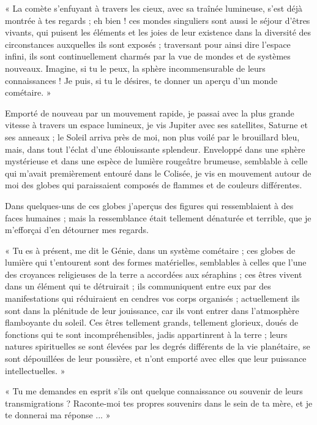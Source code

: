 \documentclass[a4paper, 11pt, oneside, landscape]{article}
\begin{document}
« La comète s'enfuyant à travers les cieux, avec sa traînée lumineuse, s'est déjà montrée à tes regards ; eh bien ! ces mondes singuliers sont aussi le séjour d'êtres vivants, qui puisent les éléments et les joies de leur existence dans la diversité des circonstances auxquelles ils sont exposés ; traversant pour ainsi dire l'espace infini, ils sont continuellement charmés par la vue de mondes et de systèmes nouveaux. Imagine, si tu le peux, la sphère incommensurable de leurs connaissances ! Je puis, si tu le désires, te donner un aperçu d'un monde cométaire. »

Emporté de nouveau par un mouvement rapide, je passai avec la plus grande vitesse à travers un espace lumineux, je vis Jupiter avec ses satellites, Saturne et ses anneaux ; le Soleil arriva près de moi, non plus voilé par le brouillard bleu, mais, dans tout l'éclat d'une éblouissante splendeur. Enveloppé dans une sphère mystérieuse et dans une espèce de lumière rougeâtre brumeuse, semblable à celle qui m'avait premièrement entouré dans le Colisée, je vis en mouvement autour de moi des globes qui paraissaient composés de flammes et de couleurs différentes.

Dans quelques-uns de ces globes j'aperçus des figures qui ressemblaient à des faces humaines ; mais la ressemblance était tellement dénaturée et terrible, que je m'efforçai d'en détourner mes regards.

« Tu es à présent, me dit le Génie, dans un système cométaire ; ces globes de lumière qui t'entourent sont des formes matérielles, semblables à celles que l'une des croyances religieuses de la terre a accordées aux séraphins ; ces êtres vivent dans un élément qui te détruirait ; ils communiquent entre eux par des manifestations qui réduiraient en cendres vos corps organisés ; actuellement ils sont dans la plénitude de leur jouissance, car ils vont entrer dans l'atmosphère flamboyante du soleil. Ces êtres tellement grands, tellement glorieux, doués de fonctions qui te sont incompréhensibles, jadis appartinrent à la terre ; leurs natures spirituelles se sont élevées par les degrés différents de la vie planétaire, se sont dépouillées de leur poussière, et n'ont emporté avec elles que leur puissance intellectuelles. »

« Tu me demandes en esprit s'ils ont quelque connaissance ou souvenir de leurs transmigrations ? Raconte-moi tes propres souvenirs dans le sein de ta mère, et je te donnerai ma réponse ... »
\end{document}
